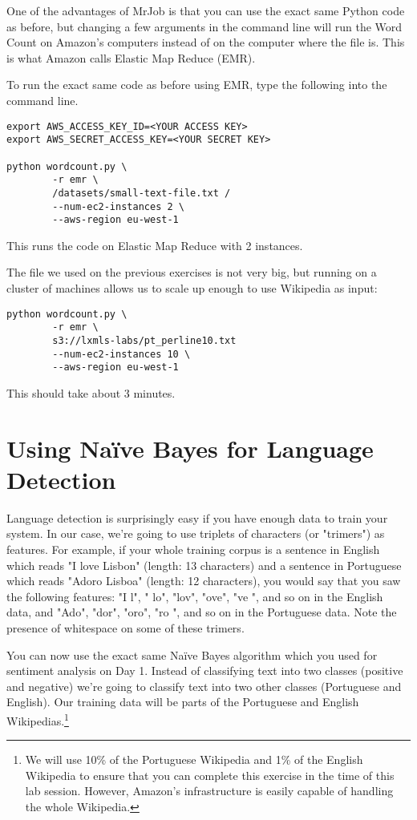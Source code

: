 One of the advantages of MrJob is that you can use the exact same Python code as before, but changing a few arguments in the command line will run the Word Count on Amazon's computers instead of on the computer where the file is. This is what Amazon calls Elastic Map Reduce (EMR).

To run the exact same code as before using EMR, type the following into the command line.

\begin{verbatim}
export AWS_ACCESS_KEY_ID=<YOUR ACCESS KEY>
export AWS_SECRET_ACCESS_KEY=<YOUR SECRET KEY>

python wordcount.py \
        -r emr \
        /datasets/small-text-file.txt /
        --num-ec2-instances 2 \
        --aws-region eu-west-1
\end{verbatim}

This runs the code on Elastic Map Reduce with 2 instances.

The file we used on the previous exercises is not very big, but running on a cluster of machines allows us to
scale up enough to use Wikipedia as input:

\begin{verbatim}
python wordcount.py \
        -r emr \
        s3://lxmls-labs/pt_perline10.txt
        --num-ec2-instances 10 \
        --aws-region eu-west-1
\end{verbatim}

This should take about 3 minutes.

\section{Using Na\"{i}ve Bayes for Language Detection}

Language detection is surprisingly easy if you have enough data to train your system. In our case, we're going to use triplets of characters (or "trimers") as features. For example, if your whole training corpus is a sentence in English which reads "I love Lisbon" (length: 13 characters) and a sentence in Portuguese which reads "Adoro Lisboa" (length: 12 characters), you would say that you saw the following features: "I l", " lo", "lov", "ove", "ve ", and so on in the English data, and "Ado", "dor", "oro", "ro ", and so on in the Portuguese data. Note the presence of whitespace on some of these trimers.

You can now use the exact same Na\"{i}ve Bayes algorithm which you used for sentiment analysis on Day 1. Instead of classifying text into two classes (positive and negative) we're going to classify text into two other classes (Portuguese and English). Our training data will be parts of the Portuguese and English Wikipedias.\footnote{We will use 10\% of the Portuguese Wikipedia and 1\% of the English Wikipedia to ensure that you can complete this exercise in the time of this lab session. However, Amazon's infrastructure is easily capable of handling the whole Wikipedia.}

